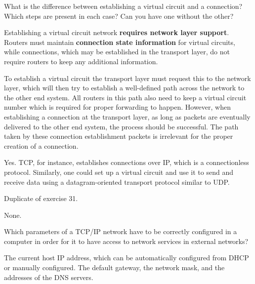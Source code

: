 \begin{Exercise}
What is the difference between establishing a virtual circuit and a connection?
Which steps are present in each case?
Can you have one without the other?
\end{Exercise}
\begin{Answer}
Establishing a virtual circuit network \textbf{requires network layer support}.
Routers must maintain \textbf{connection state information} for virtual circuits, while connections, which may be established in the transport layer, do not require routers to keep any additional information.

To establish a virtual circuit the transport layer must request this to the network layer, which will then try to establish a well-defined path across the network to the other end system.
All routers in this path also need to keep a virtual circuit number which is required for proper forwarding to happen.
However, when establishing a connection at the transport layer, as long as packets are eventually delivered to the other end system, the process should be successful.
The path taken by these connection establishment packets is irrelevant for the proper creation of a connection.

Yes. TCP, for instance, establishes connections over IP, which is a connectionless protocol.
Similarly, one could set up a virtual circuit and use it to send and receive data using a datagram-oriented transport protocol similar to UDP.
\end{Answer}

\begin{Exercise}
Duplicate of exercise 31.
\end{Exercise}
\begin{Answer}
None.
\end{Answer}

\begin{Exercise}
Which parameters of a TCP/IP network have to be correctly configured in a computer in order for it to have access to network services in external networks?
\end{Exercise}
\begin{Answer}
The current host IP address, which can be automatically configured from DHCP or manually configured.
The default gateway, the network mask, and the addresses of the DNS servers.
\end{Answer}

